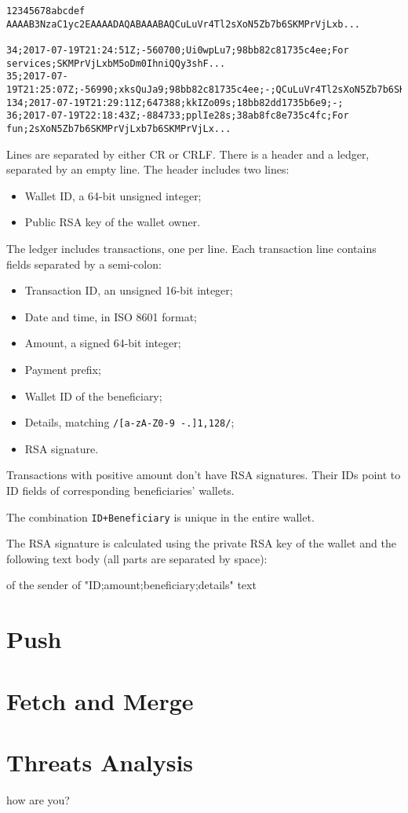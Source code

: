 \documentclass[11pt,oneside]{article}
\newcommand\dd[1]{\colorbox{gray!30}{\texttt{#1}}}
\begin{document}
\begin{verbatim}
12345678abcdef
AAAAB3NzaC1yc2EAAAADAQABAAABAQCuLuVr4Tl2sXoN5Zb7b6SKMPrVjLxb...

34;2017-07-19T21:24:51Z;-560700;Ui0wpLu7;98bb82c81735c4ee;For services;SKMPrVjLxbM5oDm0IhniQQy3shF...
35;2017-07-19T21:25:07Z;-56990;xksQuJa9;98bb82c81735c4ee;-;QCuLuVr4Tl2sXoN5Zb7b6SKMPrVjLxb...
134;2017-07-19T21:29:11Z;647388;kkIZo09s;18bb82dd1735b6e9;-;
36;2017-07-19T22:18:43Z;-884733;pplIe28s;38ab8fc8e735c4fc;For fun;2sXoN5Zb7b6SKMPrVjLxb7b6SKMPrVjLx...
\end{verbatim}

Lines are separated by either CR or CRLF.
There is a header and a ledger, separated by an empty line.
The header includes two lines:

\begin{itemize}
  \item Wallet ID, a 64-bit unsigned integer;
  \item Public RSA key of the wallet owner.
\end{itemize}

The ledger includes transactions, one per line. Each transaction line
contains fields separated by a semi-colon:

\begin{itemize}
  \item Transaction ID, an unsigned 16-bit integer;
  \item Date and time, in ISO 8601 format;
  \item Amount, a signed 64-bit integer;
  \item Payment prefix;
  \item Wallet ID of the beneficiary;
  \item Details, matching \dd{/[a-zA-Z0-9 -.]{1,128}/};
  \item RSA signature.
\end{itemize}

Transactions with positive amount don't have RSA signatures.
Their IDs point to ID fields of corresponding beneficiaries' wallets.

The combination \dd{ID+Beneficiary} is unique in the entire wallet.

The RSA signature is calculated using the private RSA key of the
wallet and the following text body (all parts are separated by space):

of the sender of "ID;amount;beneficiary;details" text
\section{Push}

\section{Fetch and Merge}

\section{Threats Analysis}

how are you?
\end{document}
